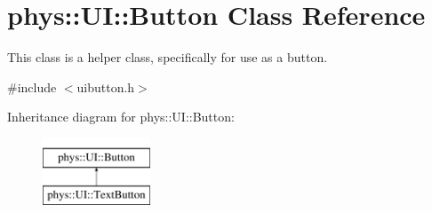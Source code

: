 \hypertarget{classphys_1_1UI_1_1Button}{
\section{phys::UI::Button Class Reference}
\label{d8/d88/classphys_1_1UI_1_1Button}
}


This class is a helper class, specifically for use as a button.  




{\ttfamily \#include $<$uibutton.h$>$}

Inheritance diagram for phys::UI::Button:\begin{figure}[H]
\begin{center}
\leavevmode
\includegraphics[height=2cm]{d8/d88/classphys_1_1UI_1_1Button}
\end{center}
\end{figure}
